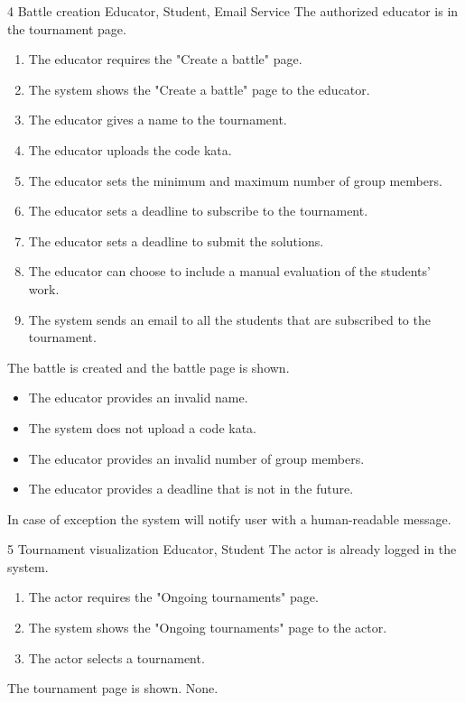 \usecase
{4}
{Battle creation}
{Educator, Student, Email Service}
{The authorized educator is in the tournament page.}
{
    \begin{enumerate}
        \item The educator requires the "Create a battle" page.
        \item The system shows the "Create a battle" page to the educator.
        \item The educator gives a name to the tournament.
        \item The educator uploads the code kata.
        \item The educator sets the minimum and maximum number of group members.
        \item The educator sets a deadline to subscribe to the tournament.
        \item The educator sets a deadline to submit the solutions.
        \item The educator can choose to include a manual evaluation of the students' work.
        \item The system sends an email to all the students that are subscribed to the tournament.
    \end{enumerate}
}
{The battle is created and the battle page is shown.}
{
    \begin{itemize}
        \item The educator provides an invalid name.
        \item The system does not upload a code kata.
        \item The educator provides an invalid number of group members.
        \item The educator provides a deadline that is not in the future.
    \end{itemize}
}
{
    In case of exception the system will notify user with a human-readable message.
}


\clearpage

\usecase
{5}
{Tournament visualization}
{Educator, Student}
{The actor is already logged in the system.}
{
    \begin{enumerate}
        \item The actor requires the "Ongoing tournaments" page.
        \item The system shows the "Ongoing tournaments" page to the actor.
        \item The actor selects a tournament.
    \end{enumerate}
}
{The tournament page is shown.}
{
    None.
}
{}


